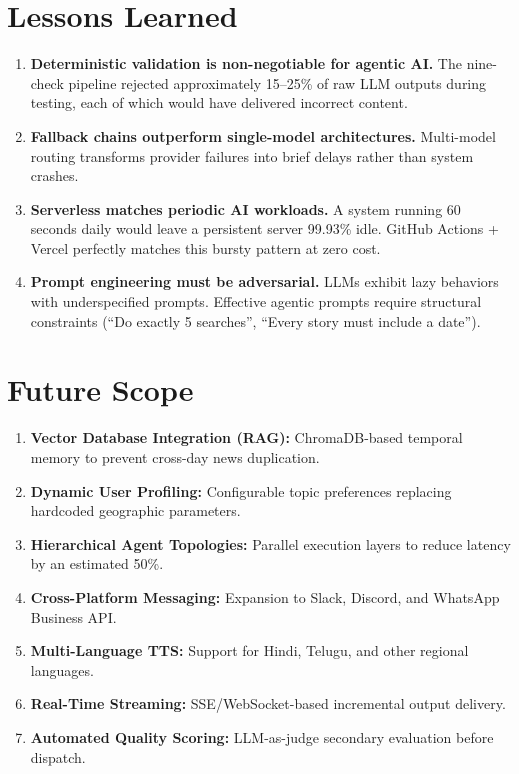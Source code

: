 \documentclass[12pt,a4paper]{report}
\begin{document}
\section{Lessons Learned}
\begin{enumerate}
    \item \textbf{Deterministic validation is non-negotiable for agentic AI.} The nine-check pipeline rejected approximately 15--25\% of raw LLM outputs during testing, each of which would have delivered incorrect content.
    \item \textbf{Fallback chains outperform single-model architectures.} Multi-model routing transforms provider failures into brief delays rather than system crashes.
    \item \textbf{Serverless matches periodic AI workloads.} A system running 60 seconds daily would leave a persistent server 99.93\% idle. GitHub Actions + Vercel perfectly matches this bursty pattern at zero cost.
    \item \textbf{Prompt engineering must be adversarial.} LLMs exhibit lazy behaviors with underspecified prompts. Effective agentic prompts require structural constraints (``Do exactly 5 searches'', ``Every story must include a date'').
\end{enumerate}

\section{Future Scope}
\begin{enumerate}
    \item \textbf{Vector Database Integration (RAG):} ChromaDB-based temporal memory to prevent cross-day news duplication.
    \item \textbf{Dynamic User Profiling:} Configurable topic preferences replacing hardcoded geographic parameters.
    \item \textbf{Hierarchical Agent Topologies:} Parallel execution layers to reduce latency by an estimated 50\%.
    \item \textbf{Cross-Platform Messaging:} Expansion to Slack, Discord, and WhatsApp Business API.
    \item \textbf{Multi-Language TTS:} Support for Hindi, Telugu, and other regional languages.
    \item \textbf{Real-Time Streaming:} SSE/WebSocket-based incremental output delivery.
    \item \textbf{Automated Quality Scoring:} LLM-as-judge secondary evaluation before dispatch.
\end{enumerate}
\end{document}
